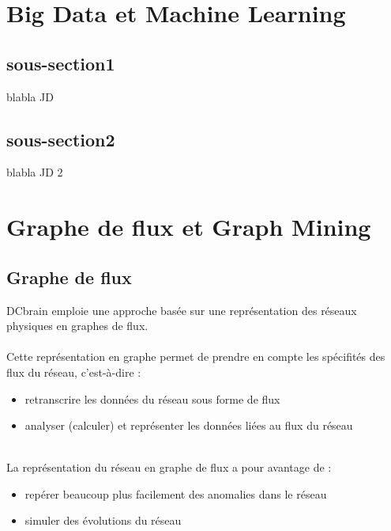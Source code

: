 	\section{Big Data et Machine Learning}
	\subsection{sous-section1}
	\begin{frame}
		blabla JD
	\end{frame}
	\subsection{sous-section2}
	\begin{frame}
		blabla JD 2
	\end{frame}
	
	\section{Graphe de flux et Graph Mining}
	\subsection{Graphe de flux}
	\begin{frame}
		DCbrain emploie une approche basée sur une représentation des réseaux physiques en graphes de flux.\\~\\
		\pause
		Cette représentation en graphe permet de prendre en compte les spécifités des flux du réseau, c'est-à-dire :
		\begin{itemize}
		\pause
		\item retranscrire les données du réseau sous forme de flux
		\pause
		\item analyser (calculer) et représenter les données liées au flux du réseau
		\end{itemize}
		~\\
		\pause
		La représentation du réseau en graphe de flux a pour avantage de : 
		\begin{itemize}
		\pause
		\item repérer beaucoup plus facilement des anomalies dans le réseau
		\pause
		\item simuler des évolutions du réseau
		\end{itemize}
	\end{frame}
	
